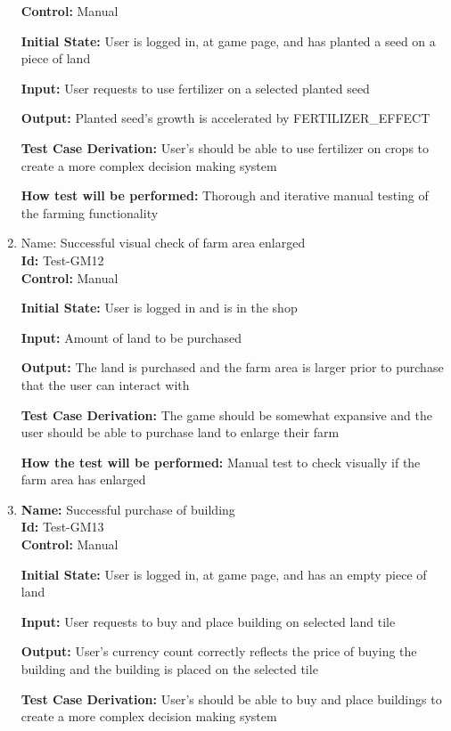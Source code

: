 \documentclass[12pt, titlepage]{article}
\begin{document}
\begin{enumerate}
\textbf{Control:} Manual
					
\textbf{Initial State: }User is logged in, at game page, and has planted a seed on a piece of land
					
\textbf{Input:} User requests to use fertilizer on a selected planted seed
					
\textbf{Output: }Planted seed's growth is accelerated by FERTILIZER\_EFFECT

\textbf{Test Case Derivation:} User's should be able to use fertilizer on crops to create a more complex decision making system

\textbf{How test will be performed:} Thorough and iterative manual testing of the farming functionality

\item{Name: Successful visual check of farm area enlarged\\} %
\textbf{Id:} Test-GM12 \label{Test-GM12}\\

\textbf{Control:} Manual

\textbf{Initial State:} User is logged in and is in the shop

\textbf{Input:} Amount of land to be purchased

\textbf{Output:} The land is purchased and the farm area is larger prior to purchase that the user can interact with

\textbf{Test Case Derivation: }The game should be somewhat expansive and the user should be able to purchase land to enlarge their farm

\textbf{How the test will be performed: }Manual test to check visually if the farm area has enlarged

\item{\textbf{Name:} Successful purchase of building\\} %
\textbf{Id:} Test-GM13 \label{Test-GM13}\\

\textbf{Control:} Manual
					
\textbf{Initial State:} User is logged in, at game page, and has an empty piece of land
					
\textbf{Input:} User requests to buy and place building on selected land tile
					
\textbf{Output:} User's currency count correctly reflects the price of buying the building and the building is placed on the selected tile

\textbf{Test Case Derivation:} User's should be able to buy and place buildings to create a more complex decision making system


\end{enumerate}
\end{document}
